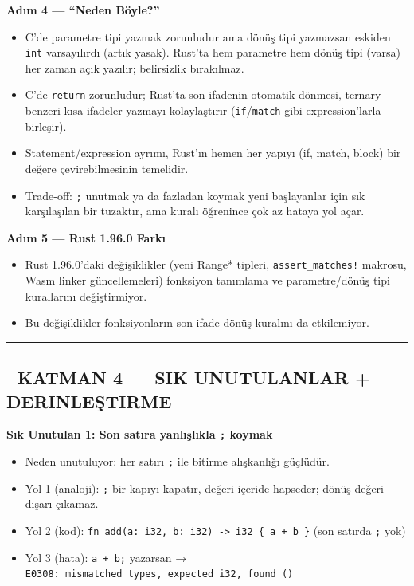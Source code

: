 \documentclass[12pt,a4paper]{article}
\begin{document}
\textbf{Adım 4 --- ``Neden Böyle?''}

\begin{itemize}
\tightlist
\item
  C'de parametre tipi yazmak zorunludur ama dönüş tipi yazmazsan eskiden \texttt{int} varsayılırdı (artık yasak). Rust'ta hem parametre hem dönüş tipi (varsa) her zaman açık yazılır; belirsizlik bırakılmaz.
\item
  C'de \texttt{return} zorunludur; Rust'ta son ifadenin otomatik dönmesi, ternary benzeri kısa ifadeler yazmayı kolaylaştırır (\texttt{if}/\texttt{match} gibi expression'larla birleşir).
\item
  Statement/expression ayrımı, Rust'ın hemen her yapıyı (if, match, block) bir değere çevirebilmesinin temelidir.
\item
  Trade-off: \texttt{;} unutmak ya da fazladan koymak yeni başlayanlar için sık karşılaşılan bir tuzaktır, ama kuralı öğrenince çok az hataya yol açar.
\end{itemize}

\textbf{Adım 5 --- Rust 1.96.0 Farkı}

\begin{itemize}
\tightlist
\item
  Rust 1.96.0'daki değişiklikler (yeni Range* tipleri, \texttt{assert\_matches!} makrosu, Wasm linker güncellemeleri) fonksiyon tanımlama ve parametre/dönüş tipi kurallarını değiştirmiyor.
\item
  Bu değişiklikler fonksiyonların son-ifade-dönüş kuralını da etkilemiyor.
\end{itemize}

\begin{center}\rule{0.5\linewidth}{0.5pt}\end{center}

\subsection{🔴 KATMAN 4 --- SIK UNUTULANLAR + DERINLEŞTIRME}\label{katman-4-—-sik-unutulanlar-derinleştirme-9}

\textbf{Sık Unutulan 1: Son satıra yanlışlıkla \texttt{;} koymak}

\begin{itemize}
\tightlist
\item
  Neden unutuluyor: her satırı \texttt{;} ile bitirme alışkanlığı güçlüdür.
\item
  Yol 1 (analoji): \texttt{;} bir kapıyı kapatır, değeri içeride hapseder; dönüş değeri dışarı çıkamaz.
\item
  Yol 2 (kod): \texttt{fn\ add(a:\ i32,\ b:\ i32)\ -\textgreater{}\ i32\ \{\ a\ +\ b\ \}} (son satırda \texttt{;} yok)
\item
  Yol 3 (hata): \texttt{a\ +\ b;} yazarsan → \texttt{E0308:\ mismatched\ types,\ expected\ i32,\ found\ ()}
\end{itemize}
\end{document}
